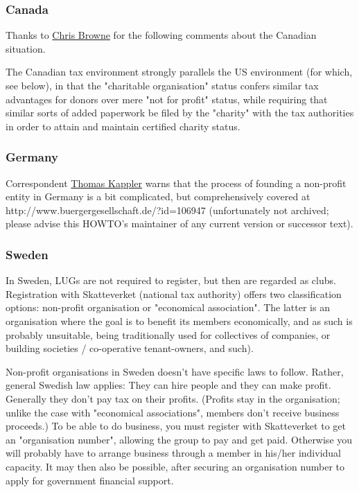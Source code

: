 \documentclass{HOWTO}
\begin{document}
\subsubsection{Canada}

Thanks to \ifpdf
\href{mailto:cbbrowne@cbbrowne.com}{Chris Browne}%
\else
{}%
\fi{}
 for the following comments about the Canadian situation.



The Canadian tax environment strongly parallels the US environment (for which,
see below), in that the "charitable organisation" status confers similar tax
advantages for donors over mere "not for profit" status, while
requiring that similar sorts of added paperwork be filed by the
"charity" with the tax authorities in order to attain and maintain
certified charity status.




\subsubsection{Germany}

Correspondent \ifpdf
\href{mailto:Thomas.Kappler@stud.uni-karlsruhe.de}{Thomas Kappler}%
\else
{}%
\fi{}
 warns that the process of founding a non-profit entity in Germany
is a bit complicated, but comprehensively covered at 
http://www.buergergesellschaft.de/?id=106947 (unfortunately not archived; please
advise this HOWTO's maintainer of any current version or successor text).




\subsubsection{Sweden}

In Sweden, LUGs are not required to register, but then are regarded as 
clubs.  Registration with Skatteverket (national tax authority) offers 
two classification options:  non-profit organisation or "economical 
association". The latter is an organisation where the goal is to benefit 
its members economically, and as such is probably unsuitable, being 
traditionally used for collectives of companies, or building societies 
/ co-operative tenant-owners, and such).

Non-profit organisations in Sweden doesn't have specific laws to follow. 
Rather, general Swedish law applies: They can hire people and they can 
make profit. Generally they don't pay tax on their profits. (Profits 
stay in the organisation; unlike the case with "economical associations", 
members don't receive business proceeds.) To be able to do business, you
must register with Skatteverket to get an "organisation number", allowing 
the group to pay and get paid. Otherwise you will probably have to 
arrange business through a member in his/her individual capacity.  
It may then also be possible, after securing an organisation number to 
apply for government financial support.
\end{document}
